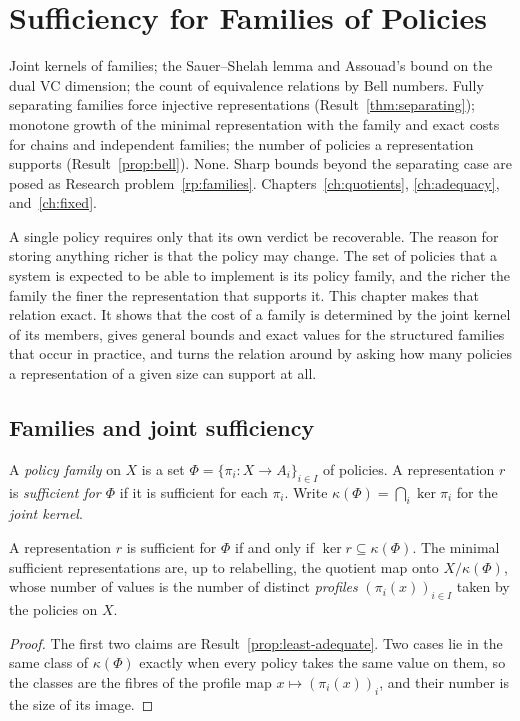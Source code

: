 \chapter{Sufficiency for Families of Policies}\label{ch:families}
{Joint kernels of families; the Sauer--Shelah lemma and Assouad's bound on the dual VC dimension; the count of equivalence relations by Bell numbers.}
{Fully separating families force injective representations (Result~\ref{thm:separating}); monotone growth of the minimal representation with the family and exact costs for chains and independent families; the number of policies a representation supports (Result~\ref{prop:bell}).}
{None. Sharp bounds beyond the separating case are posed as Research problem~\ref{rp:families}.}
{Chapters~\ref{ch:quotients}, \ref{ch:adequacy}, and~\ref{ch:fixed}.}

A single policy requires only that its own verdict be recoverable. The reason for storing anything richer is that the policy may change. The set of policies that a system is expected to be able to implement is its policy family, and the richer the family the finer the representation that supports it. This chapter makes that relation exact. It shows that the cost of a family is determined by the joint kernel of its members, gives general bounds and exact values for the structured families that occur in practice, and turns the relation around by asking how many policies a representation of a given size can support at all.

\section{Families and joint sufficiency}

\begin{definition}\label{def:family}
A \emph{policy family} on $X$ is a set $\Phi=\{\pi_i:X\to A_i\}_{i\in I}$ of policies. A representation $r$ is \emph{sufficient for $\Phi$} if it is sufficient for each $\pi_i$. Write $\kappa(\Phi)=\bigcap_i\ker\pi_i$ for the \emph{joint kernel}.
\end{definition}

\begin{established}\label{thm:joint-sufficiency}
A representation $r$ is sufficient for $\Phi$ if and only if $\ker r\subseteq\kappa(\Phi)$. The minimal sufficient representations are, up to relabelling, the quotient map onto $X/\kappa(\Phi)$, whose number of values is the number of distinct \emph{profiles} $(\pi_i(x))_{i\in I}$ taken by the policies on $X$.
\end{established}
\begin{proof}
The first two claims are Result~\ref{prop:least-adequate}. Two cases lie in the same class of $\kappa(\Phi)$ exactly when every policy takes the same value on them, so the classes are the fibres of the profile map $x\mapsto(\pi_i(x))_i$, and their number is the size of its image.
\end{proof}


